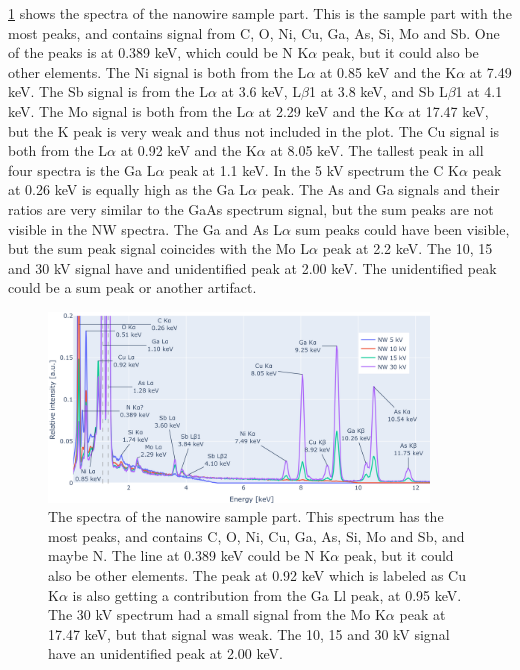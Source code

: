 \cref{fig:results:Spectra_NW} shows the spectra of the nanowire sample part.
This is the sample part with the most peaks, and contains signal from C, O, Ni, Cu, Ga, As, Si, Mo and Sb.
One of the peaks is at 0.389 keV, which could be N K$\alpha$ peak, but it could also be other elements. %
The Ni signal is both from the L$\alpha$ at 0.85 keV and the K$\alpha$ at 7.49 keV.
The Sb signal is from the L$\alpha$ at 3.6 keV, L$\beta$1 at 3.8 keV, and Sb L$\beta$1 at 4.1 keV. %
The Mo signal is both from the L$\alpha$ at 2.29 keV and the K$\alpha$ at 17.47 keV, but the K peak is very weak and thus not included in the plot.
The Cu signal is both from the L$\alpha$ at 0.92 keV and the K$\alpha$ at 8.05 keV.
The tallest peak in all four spectra is the Ga L$\alpha$ peak at 1.1 keV.
In the 5 kV spectrum the C K$\alpha$ peak at 0.26 keV is equally high as the Ga L$\alpha$ peak.
The As and Ga signals and their ratios are very similar to the GaAs spectrum signal, but the sum peaks are not visible in the NW spectra.
The Ga and As L$\alpha$ sum peaks could have been visible, but the sum peak signal coincides with the Mo L$\alpha$ peak at 2.2 keV. %
The 10, 15 and 30 kV signal have and unidentified peak at 2.00 keV.
The unidentified peak could be a sum peak or another artifact.

\begin{figure}[h]
    \centering
    \includegraphics[width=0.90\textwidth]{figures/each_spectra_not_on_github/NW_everything.png}
    \caption{
        The spectra of the nanowire sample part.
        This spectrum has the most peaks, and contains  C, O, Ni, Cu, Ga, As, Si, Mo and Sb, and maybe N.
        The line at 0.389 keV could be N K$\alpha$ peak, but it could also be other elements. %
        The peak at 0.92 keV which is labeled as Cu K$\alpha$ is also getting a contribution from the Ga Ll peak, at 0.95 keV. %
        The 30 kV spectrum had a small signal from the Mo K$\alpha$ peak at 17.47 keV, but that signal was weak.
        The 10, 15 and 30 kV signal have an unidentified peak at 2.00 keV. %
    }
    \label{fig:results:Spectra_NW}
\end{figure}

